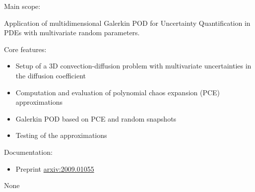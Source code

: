 \documentclass{pubsoftform}
\begin{document}


\begin{scope}

  \item[Main scope:]~

    Application of multidimensional Galerkin POD for Uncertainty Quantification
    in PDEs with multivariate random parameters.
  \item[Core features:]~
    \begin{itemize}
      \item Setup of a 3D convection-diffusion problem with multivariate
        uncertainties in the diffusion coefficient
      \item Computation and evaluation of polynomial chaos expansion (PCE)
        approximations
      \item Galerkin POD based on PCE and random snapshots
      \item Testing of the approximations
    \end{itemize}
    
  \item[Documentation:]~

	\begin{itemize}
    \item Preprint \href{http://arxiv.org/abs/2009.01055}{arxiv:2009.01055}
	\end{itemize}
\end{scope}

\begin{developers}
    \notapplicable{} %
\end{developers}

\begin{affected}
    \item[None]~\newline
\end{affected}
  
\end{document}
